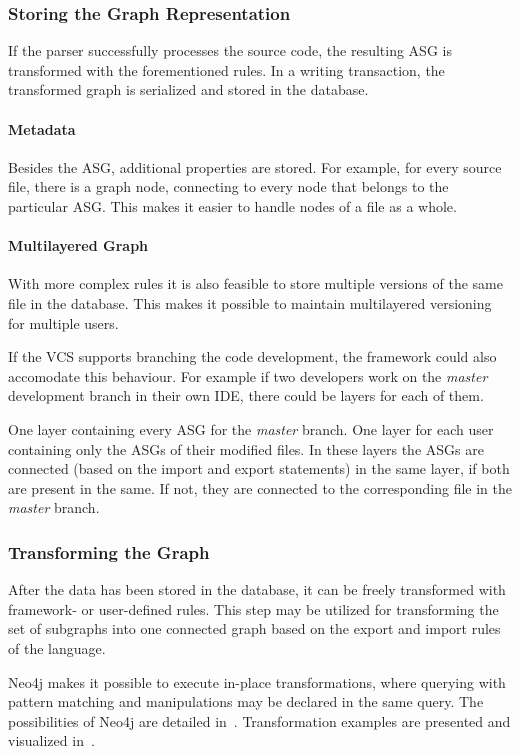 \subsubsection{Storing the Graph Representation}
If the parser successfully processes the source code, the resulting ASG is transformed with the forementioned rules. In a writing transaction, the transformed graph is serialized and stored in the database.

\paragraph{Metadata}
Besides the ASG, additional properties are stored. For example, for every source file, there is a graph node, connecting to every node that belongs to the particular ASG. This makes it easier to handle nodes of a file as a whole.

\paragraph{Multilayered Graph}
With more complex rules it is also feasible to store multiple versions of the same file in the database. This makes it possible to maintain multilayered versioning for multiple users.

If the VCS supports branching the code development, the framework could also accomodate this behaviour. For example if two developers work on the \emph{master} development branch in their own IDE, there could be layers for each of them.

One layer containing every ASG for the \emph{master} branch. One layer for each user containing only the ASGs of their modified files. In these layers the ASGs are connected (based on the import and export statements) in the same layer, if both are present in the same. If not, they are connected to the corresponding file in the \emph{master} branch. %

\subsubsection{Transforming the Graph}
After the data has been stored in the database, it can be freely transformed with framework- or user-defined rules. This step may be utilized for transforming the set of subgraphs into one connected graph based on the export and import rules of the language.

Neo4j makes it possible to execute in-place transformations, where querying with pattern matching and manipulations may be declared in the same query. The possibilities of Neo4j are detailed in~. Transformation examples are presented and visualized in~.

